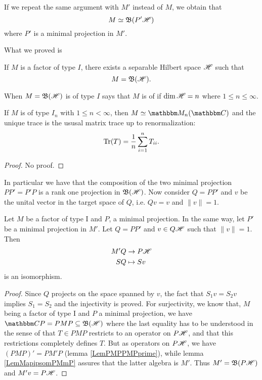 If we repeat the same argument with $M'$ instead of $M$, we obtain that 
\begin{equation}		\label{EqMPHtypeIBh}
		M\simeq\mathfrak{B}(P'\mathscr{H})
\end{equation}
where $P'$ is a minimal projection in $M'$.

What we proved is
\begin{proposition}
If $M$ is a factor of type $I$, there exists a separable Hilbert space $\mathscr{H}$ such that
\begin{equation}
	M=\mathfrak{B}(\mathscr{H}).
\end{equation}
\end{proposition}

When $M=\mathfrak{B}(\mathscr{H})$ is of type $I$ says that $M$ is of  if $\dim\mathscr{H}=n$ where $1\leq n \leq\infty$.

\begin{proposition}
If $M$ is of type $I_n$ with $1\leq n <\infty$, then $M\simeq \eM_n(\eC)$ and the unique trace is the ususal matrix trace up to renormalization:
\begin{equation}
	\operatorname{Tr}(T)=\frac{1}{ n }\sum_{i=1}^nT_{ii}.
\end{equation}
\end{proposition}
\begin{proof}
No proof.
\end{proof}

In particular we have that the composition of the two minimal projection $PP'=P'P$ is a rank one projection in $\mathfrak{B}(\mathscr{H})$. Now consider $Q=PP'$ and $v$ be the unital vector in the target space of $Q$, i.e. $Qv=v$ and $\| v \|=1$.

\begin{proposition}
Let $M$ be a factor of type I and $P$, a minimal projection. In the same way, let $P'$ be a minimal projection in $M'$. Let $Q=PP'$ and $v\in Q\mathscr{H}$ such that $\| v \|=1$. Then
\begin{equation}
\begin{aligned}
 M'Q&\to P\mathscr{H} \\ 
   SQ&\mapsto Sv 
\end{aligned}
\end{equation}
is an isomorphism.
\end{proposition}

\begin{proof}
Since $Q$ projects on the space spanned by $v$, the fact that $S_1v=S_2v$ implies $S_1=S_2$ and the injectivity is proved. For surjectivity, we know that, $M$ being a factor of type I and $P$ a minimal projection, we have $\eC P=PMP\subseteq\oB(\hH)$ where the last equality has to be understood in the sense of that $T\in PMP$ restricts to an operator on $P\mathscr{H}$, and that this restrictions completely defines $T$. But as operators on $P\mathscr{H}$, we have $(PMP)'=PM'P$ (lemma \ref{LemPMPPMPprime}), while lemma \ref{LemMapipsomPMmP} assures that the latter algebra is $M'$. Thus $M'=\mathfrak{B}(P\mathscr{H})$ and $M'v=P\mathscr{H}$.
\end{proof}

